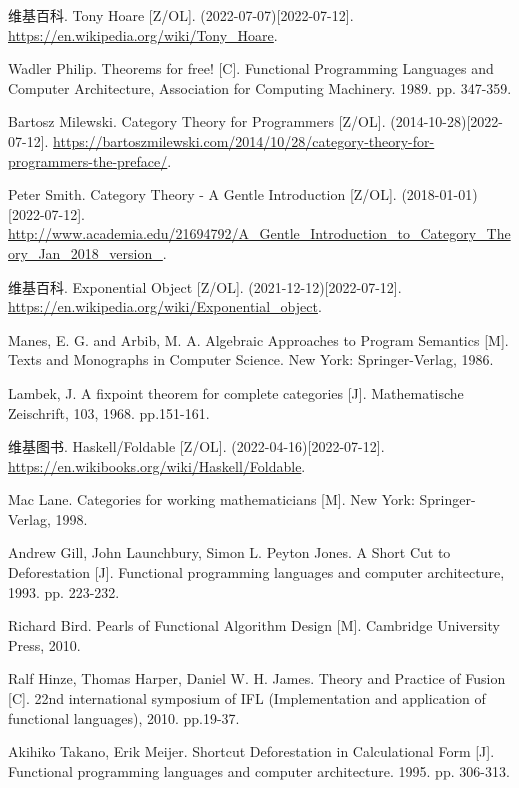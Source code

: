 \documentclass[UTF8]{article}
\begin{document}
\begin{thebibliography}{99}
维基百科. Tony Hoare [Z/OL]. (2022-07-07)[2022-07-12]. \url{https://en.wikipedia.org/wiki/Tony_Hoare}.

Wadler Philip. Theorems for free! [C]. Functional Programming Languages and Computer Architecture, Association for Computing Machinery. 1989. pp. 347-359.

Bartosz Milewski. Category Theory for Programmers [Z/OL]. (2014-10-28)[2022-07-12]. \url{https://bartoszmilewski.com/2014/10/28/category-theory-for-programmers-the-preface/}.

Peter Smith. Category Theory - A Gentle Introduction [Z/OL]. (2018-01-01)[2022-07-12]. \url{http://www.academia.edu/21694792/A_Gentle_Introduction_to_Category_Theory_Jan_2018_version_}.

维基百科. Exponential Object [Z/OL]. (2021-12-12)[2022-07-12]. \url{https://en.wikipedia.org/wiki/Exponential_object}.

Manes, E. G. and Arbib, M. A. Algebraic Approaches to Program Semantics [M]. Texts and Monographs in Computer Science. New York: Springer-Verlag, 1986.

Lambek, J. A fixpoint theorem for complete categories [J]. Mathematische Zeischrift, 103, 1968. pp.151-161.

维基图书. Haskell/Foldable [Z/OL]. (2022-04-16)[2022-07-12]. \url{https://en.wikibooks.org/wiki/Haskell/Foldable}.

Mac Lane. Categories for working mathematicians [M]. New York: Springer-Verlag, 1998. %


Andrew Gill, John Launchbury, Simon L. Peyton Jones. A Short Cut to Deforestation [J]. Functional programming languages and computer architecture, 1993. pp. 223-232.

Richard Bird. Pearls of Functional Algorithm Design [M]. Cambridge University Press, 2010. %

Ralf Hinze, Thomas Harper, Daniel W. H. James. Theory and Practice of Fusion [C]. 22nd international symposium of IFL (Implementation and application of functional languages), 2010. pp.19-37.

Akihiko Takano, Erik Meijer. Shortcut Deforestation in Calculational Form [J]. Functional programming languages and computer architecture. 1995. pp. 306-313.


\end{thebibliography}
\end{document}
